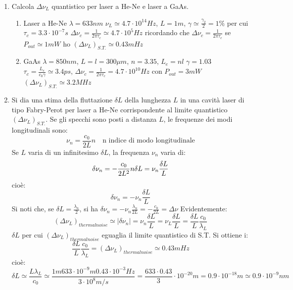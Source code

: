 \documentclass{book}
\def \D {\Delta}
\def \l {\lambda}
\theoremstyle{remark}
\begin{document}
\begin{enumerate}
\item Calcola $\D\nu_L$ quantistico per laser a He-Ne e laser a GaAs.
\begin{enumerate}
\item Laser a He-Ne $\l = 633nm$ $\nu_L \simeq 4.7\cdot 10^{14} Hz$, $L = 1m$, $\gamma \simeq \frac{\gamma_2}{2} = 1\%$ per cui $\tau_c = 3.3 \cdot 10^{-7} s$ $\D\nu_c = \frac{1}{2\pi \tau_c} \simeq 4.7 \cdot 10^5 Hz$ ricordando che $\D\nu_c = \frac{1}{2\pi\tau_c}$ se $P_{out} \simeq 1mW$ ho $(\D\nu_L)_{S.T.} \simeq 0.43 mHz$
\item GaAs $\l = 850 nm$, $L = l = 300 \mu m$, $n= 3.35$, $L_e=nl$ $\gamma = 1.03$ $\tau_c = \frac{L_e}{c_0 \gamma} \simeq 3.4 ps$, $\D\nu_c = \frac{1}{2\pi \tau_c} = 4.7 \cdot 10^{10} Hz$
con $P_{out} = 3mW$ $(\D\nu_L)_{S.T.} \simeq 3.2 MHz$
\end{enumerate}
\item Si dia una stima della fluttazione $\delta L$ della lunghezza $L$ in una cavità laser di tipo Fabry-Perot per laser a He-Ne corrispondente al limite quantistico $(\D\nu_L)_{S.T.}$. Se gli specchi sono posti a distanza $L$, le frequenze dei modi longitudinali sono:
\begin{equation*}
\nu_n = \frac{c_0}{2L} n \quad \text{n indice di modo longitudinale}
\end{equation*}
Se $L$ varia di un infinitesimo $\delta L$, la frequenza $\nu_n$ varia di:
\begin{equation*}
\delta \nu_n = -\frac{c_0}{2L^2} n \delta L = \-\nu_n \frac{\delta L}{L}
\end{equation*}
cioè:
\begin{equation*}
\delta \nu_n = -\nu_n \frac{\delta L}{L}
\end{equation*}
Si noti che, se $\delta L = \frac{\l_n}{2}$, si ha $\delta \nu_n= - \nu_n \frac{\l_n}{2L} = -\frac{c_0}{2L} = \D \nu$
Evidentemente:
\begin{equation*}
(\D\nu_L)_{thermal noise} \simeq |\delta \nu_n| = \nu_n \frac{\delta L}{L} = \nu_L\frac{\delta L}{L} = \frac{\delta L}{L} \frac{c_0}{\l_L}
\end{equation*}
$\delta L$ per cui $(\D\nu_L)_{thermal noise}$ eguaglia il limite quantistico di S.T.
Si ottiene i:
\begin{equation*}
\frac{\delta L}{L} \frac{c_0}{\l_L} = (\D\nu_L)_{thermal noise} \simeq 0.43 mHz
\end{equation*}
cioè:
\begin{equation*}
\delta L \simeq \frac{L \l_L}{c_0} \simeq \frac{1 m 633 \cdot 10^{-9} m 0.43 \cdot 10^{-3} Hz}{3 \cdot 10^8 m/s} = \frac{633 \cdot 0.43}{3} \cdot 10^{-20} m = 0.9 \cdot 10^{-18} m \simeq 0.9 \cdot 10^{-9} nm
\end{equation*}
\end{enumerate}
\end{document}

